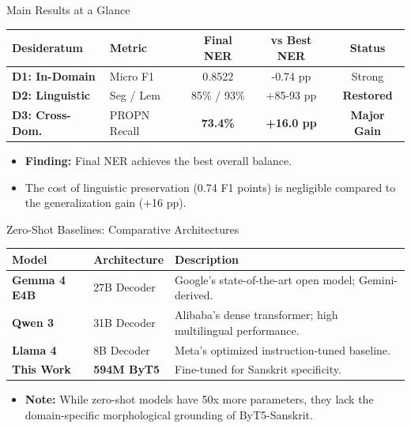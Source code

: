 \documentclass[10pt]{beamer}
\def\tpage{}
\newcommand{\tp}[1]{\def\tpage{#1}}
\begin{document}
\begin{frame}{Main Results at a Glance}
    \tp{34}
    \begin{table}
        \centering
        \small
        \begin{tabular}{llccc}
            \toprule
            \textbf{Desideratum} & \textbf{Metric} & \textbf{Final NER} & \textbf{vs Best NER} & \textbf{Status} \\
            \midrule
            \textbf{D1: In-Domain} & Micro F1 & 0.8522 & -0.74 pp & Strong \\
            \textbf{D2: Linguistic} & Seg / Lem & 85\% / 93\% & +85-93 pp & \textbf{Restored} \\
            \textbf{D3: Cross-Dom.} & PROPN Recall & \textbf{73.4\%} & \textbf{+16.0 pp} & \textbf{Major Gain} \\
            \bottomrule
        \end{tabular}
    \end{table}
    \vfill
    \begin{itemize}
        \item \textbf{Finding:} Final NER achieves the best overall balance.
        \item The cost of linguistic preservation (0.74 F1 points) is negligible compared to the generalization gain (+16 pp).
    \end{itemize}
\end{frame}

\begin{frame}{Zero-Shot Baselines: Comparative Architectures}
    \tp{37}
    \begin{table}
        \centering
        \small
        \begin{tabular}{lp{2cm}p{4cm}}
            \toprule
            \textbf{Model} & \textbf{Architecture} & \textbf{Description} \\
            \midrule
            \textbf{Gemma 4 E4B} & 27B Decoder & Google's state-of-the-art open model; Gemini-derived. \\
            \textbf{Qwen 3} & 31B Decoder & Alibaba's dense transformer; high multilingual performance. \\
            \textbf{Llama 4} & 8B Decoder & Meta's optimized instruction-tuned baseline. \\
            \midrule
            \textbf{This Work} & \textbf{594M ByT5} & Fine-tuned for Sanskrit specificity. \\
            \bottomrule
        \end{tabular}
    \end{table}
    \vfill
    \begin{itemize}
        \item \textbf{Note:} While zero-shot models have 50x more parameters, they lack the domain-specific morphological grounding of ByT5-Sanskrit.
    \end{itemize}
\end{frame}
\end{document}
